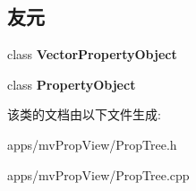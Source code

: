 \subsection*{友元}
\begin{DoxyCompactItemize}
\item 
\hypertarget{class_prop_tree_a09b347a68a1b777630092cb396cda26d}{class {\bfseries Vector\+Property\+Object}}\label{class_prop_tree_a09b347a68a1b777630092cb396cda26d}

\item 
\hypertarget{class_prop_tree_aeb72bbbd6ba8dd70e4b62cd500e4aad3}{class {\bfseries Property\+Object}}\label{class_prop_tree_aeb72bbbd6ba8dd70e4b62cd500e4aad3}

\end{DoxyCompactItemize}


该类的文档由以下文件生成\+:\begin{DoxyCompactItemize}
\item 
apps/mv\+Prop\+View/Prop\+Tree.\+h\item 
apps/mv\+Prop\+View/Prop\+Tree.\+cpp\end{DoxyCompactItemize}
